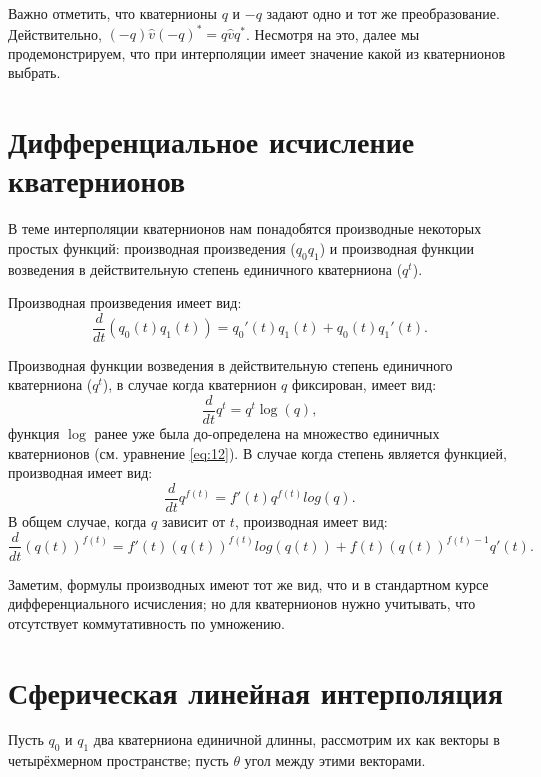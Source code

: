 \documentclass[draft]{article}
\begin{document}
Важно отметить, что кватернионы $q$ и $-q$ задают одно и тот же преобразование. Действительно, $(-q)\widehat{v}(-q)^* = q\widehat{v}q^*$. Несмотря на это, далее мы продемонстрируем, что при интерполяции имеет значение какой из кватернионов выбрать.

\section{Дифференциальное исчисление \\ кватернионов}

В теме интерполяции кватернионов нам понадобятся производные некоторых простых функций: производная произведения ($q_0 q_1$) и производная функции возведения в действительную степень единичного кватерниона ($q^t$).

Производная произведения имеет вид:
\begin{equation}
\label{eq:13}
\frac{d}{dt}(q_0(t) q_1(t)) = q_0'(t) q_1(t) + q_0(t) q_1'(t).
\end{equation}

Производная функции возведения в действительную степень единичного кватерниона ($q^t$), в случае когда кватернион $q$ фиксирован, имеет вид:
\begin{equation}
\label{eq:14}
\frac{d}{dt}q^t = q^t\log(q) ,
\end{equation}
функция $\log$ ранее уже была до-определена на множество единичных кватернионов (см. уравнение \ref{eq:12}). В случае когда степень является функцией, производная имеет вид:
\begin{equation}
\label{eq:15}
\frac{d}{dt}q^{f(t)} = f'(t)q^{f(t)}log(q) .
\end{equation}
В общем случае, когда $q$ зависит от $t$, производная имеет вид:
\begin{equation}
\label{eq:16}
\frac{d}{dt}(q(t))^{f(t)} = f'(t)(q(t))^{f(t)}log(q(t)) + f(t)(q(t))^{f(t) - 1}q'(t).
\end{equation}

Заметим, формулы производных имеют тот же вид, что и в стандартном курсе дифференциального исчисления; но для кватернионов нужно учитывать, что отсутствует коммутативность по умножению.

\section{Сферическая линейная интерполяция}

Пусть $q_0$ и $q_1$ два кватерниона единичной длинны, рассмотрим их как векторы в четырёхмерном пространстве; пусть $\theta$ угол между этими векторами.
\end{document}
